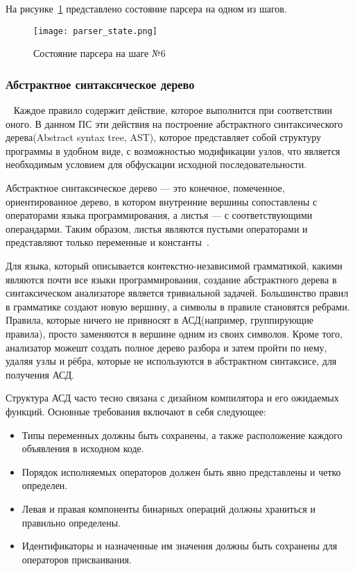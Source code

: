 На рисунке~\ref{fig:arch_and_mod::lr_example_img} представлено состояние парсера на одном из шагов.

\begin{figure}[!htb]
  \centering
  \texttt{[image: parser\_state.png]}
  \caption{ Состояние парсера на шаге №6 }
  \label{fig:arch_and_mod::lr_example_img}
\end{figure}



\subsubsection{Абстрактное синтаксическое дерево}~
\label{sub:arch_and_mod:ast}
Каждое правило содержит действие, которое выполнится при соответствии оного. В данном ПС эти действия на построение абстрактного синтаксического дерева(Abstract syntax tree, AST), которое представляет собой структуру программы в удобном виде, с возможностью модификации узлов, что является необходимым условием для обфускации исходной последовательности.

Абстрактное синтаксическое дерево --- это конечное, помеченное, ориентированное дерево, в котором внутренние вершины сопоставлены с операторами языка программирования, а листья --- с соответствующими операндарми. Таким образом, листья являются пустыми операторами и представляют только переменные и константы~\cite{ast}.

Для языка, который описывается контекстно-независимой грамматикой, какими являются почти все языки программирования, создание абстрактного дерева в синтаксическом анализаторе является тривиальной задачей. Большинство правил в грамматике создают новую вершину, а символы в правиле становятся ребрами. Правила, которые ничего не привносят в АСД(например, группирующие правила), просто заменяются в вершине одним из своих символов. Кроме того, анализатор можешт создать полное дерево разбора и затем пройти по нему, удаляя узлы и рёбра, которые не используются в абстрактном синтаксисе, для получения АСД.

Структура АСД часто тесно связана с дизайном компилятора и его ожидаемых функций.
Основные требования включают в себя следующее:
\begin{itemize}
\item  Типы переменных должны быть сохранены, а также расположение каждого объявления в исходном коде.
\item  Порядок исполняемых операторов должен быть явно представлены и четко определен.
\item  Левая и правая компоненты бинарных операций должны храниться и правильно определены.
\item  Идентификаторы и назначенные им значения должны быть сохранены для операторов присваивания.
\end{itemize}


